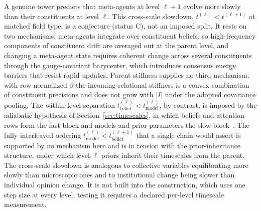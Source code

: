 \documentclass[11pt]{article}
\begin{document}
A genuine tower predicts that meta-agents at level $\ell+1$ evolve more slowly than their constituents at level $\ell$. This cross-scale slowdown, $t^{(\ell)} < t^{(\ell+1)}$ at matched field type, is a conjecture (status C), not an imposed split. It rests on two mechanisms: meta-agents integrate over constituent beliefs, so high-frequency components of constituent drift are averaged out at the parent level, and changing a meta-agent state requires coherent change across several constituents through the gauge-covariant barycenter, which introduces consensus energy barriers that resist rapid updates. Parent stiffness supplies no third mechanism: with row-normalized $\beta$ the incoming relational stiffness is a convex combination of constituent precisions and does not grow with $|I|$ under the adopted covariance pooling. The within-level separation $t_{\mathrm{belief}}^{(\ell)} < t_{\mathrm{model}}^{(\ell)}$, by contrast, is imposed by the adiabatic hypothesis of Section~\ref{sec:timescales}, in which beliefs and attention rows form the fast block and models and prior parameters the slow block~\cite[Ch.~8]{DennisGaugeVFE2026}. The fully interleaved ordering $t_{\mathrm{model}}^{(\ell)} < t_{\mathrm{belief}}^{(\ell+1)}$ that a single chain would assert is supported by no mechanism here and is in tension with the prior-inheritance structure, under which level-$\ell$ priors inherit their timescales from the parent. The cross-scale slowdown is analogous to collective variables equilibrating more slowly than microscopic ones and to institutional change being slower than individual opinion change. It is not built into the construction, which uses one step size at every level; testing it requires a declared per-level timescale measurement.
\end{document}

